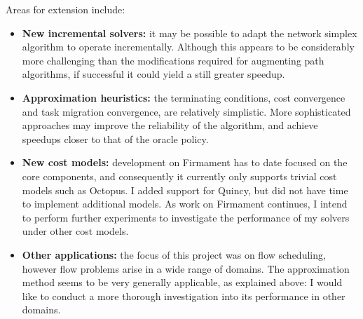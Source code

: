 Areas for extension include:
\begin{itemize}
    \item \textbf{New incremental solvers:} it may be possible to adapt the network simplex algorithm to operate incrementally. Although this appears to be considerably more challenging than the modifications required for augmenting path algorithms, if successful it could yield a still greater speedup.
    \item \textbf{Approximation heuristics:} the terminating conditions, cost convergence and task migration convergence, are relatively simplistic. More sophisticated approaches may improve the reliability of the algorithm, and achieve speedups closer to that of the oracle policy.
    \item \textbf{New cost models:} development on Firmament has to date focused on the core components, and consequently it currently only supports trivial cost models such as Octopus. I added support for Quincy, but did not have time to implement additional models. As work on Firmament continues, I intend to perform further experiments to investigate the performance of my solvers under other cost models.
    \item \textbf{Other applications:} the focus of this project was on flow scheduling, however flow problems arise in a wide range of domains. The approximation method seems to be very generally applicable, as explained above: I would like to conduct a more thorough investigation into its performance in other domains. 
\end{itemize}